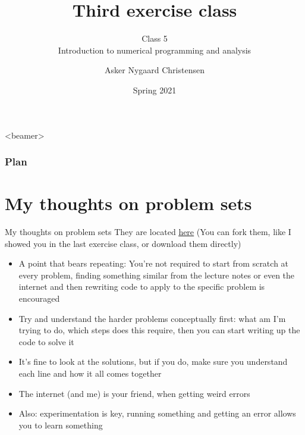 \documentclass[10pt,danish,t,10pt]{beamer}
\title{Third exercise class \vspace{-2mm}}
\subtitle{Class 5 \\Introduction to numerical programming and analysis \vspace{-4mm} }
\author{Asker Nygaard Christensen}
\date{Spring 2021}
\makeatletter
\let\origtableofcontents=\tableofcontents
\def\tableofcontents{\@ifnextchar[{\origtableofcontents}{\gobbletableofcontents}}
\def\gobbletableofcontents#1{\origtableofcontents}
\makeatother
\begin{document}
{
\begin{frame}

\maketitle


\end{frame}
}

\addtocounter{framenumber}{-1}

\begin{frame}<beamer>
\frametitle{Plan}

\tableofcontents[]
\end{frame}

\section{My thoughts on problem sets}

\begin{frame}{My thoughts on problem sets}
They are located \href{https://github.com/NumEconCopenhagen/exercises-2021}{\underline{here}} (You can fork them, like I showed you in the last exercise class, or download them directly)
    \begin{itemize}
        \item A point that bears repeating: You're not required to start from scratch at every problem, finding something similar from the lecture notes or even the internet and then rewriting code to apply to the specific problem is encouraged
        \item Try and understand the harder problems conceptually first: what am I'm trying to do, which steps does this require, then you can start writing up the code to solve it
        \item It's fine to look at the solutions, but if you do, make sure you understand each line and how it all comes together
        \item The internet (and me) is your friend, when getting weird errors
        \item Also: experimentation is key, running something and getting an error allows you to learn something
    \end{itemize}
\end{frame}
\end{document}
